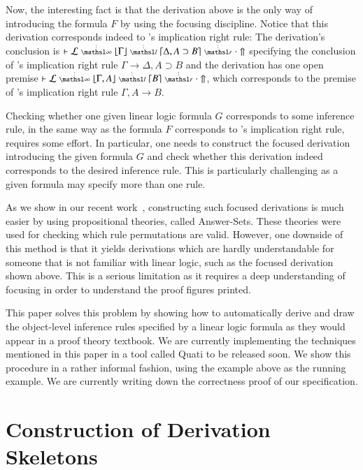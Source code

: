 \documentclass[a4paper,10pt]{article}
\newcommand\lra{\longrightarrow}
\begin{document}
Now, the interesting fact is that the derivation above is the only way of
introducing the formula $F$ by using the focusing discipline. Notice that this
derivation corresponds indeed to \mLJ's implication right rule: The derivation's
conclusion is $\llfDash \lEnc \ndots{\infty} \lft{\Gamma} \ndots{l}
{\rght{\Delta, A \supset B}} \ndots{r} \cdot \Uparrow$ specifying the conclusion
of \mLJ's implication right rule $\Gamma \lra \Delta, A \supset B$ and the
derivation has one open premise $\llfDash \lEnc \ndots{\infty} \lft{\Gamma, A}
\ndots{l} \rght{B} \ndots{r} \cdot \Uparrow$, which corresponds to the premise
of \mLJ's implication right rule $\Gamma, A \lra B$.

Checking whether one given linear logic formula $G$ corresponds to some
inference rule, in the same way as the formula $F$ corresponds to \mLJ's
implication right rule, requires some effort. In particular, one needs
to construct the focused derivation introducing the given formula $G$ and check whether this derivation indeed
corresponds to the desired inference rule. This is particularly challenging as a given formula may specify 
more than one rule. 

As we show in our recent work~\cite{nigam13iclp}, constructing such focused derivations is 
much easier by using propositional theories, called Answer-Sets. These theories were used for
checking which rule permutations are valid. However, one downside of this method is that it 
yields derivations which are hardly understandable for someone that is not familiar with linear logic, 
such as the focused derivation shown above. This is a serious limitation as it requires
a deep understanding of focusing in order to understand the proof figures printed.

This paper solves this problem by showing how to automatically derive and draw
the object-level inference rules
specified by a linear logic formula as they would appear in a proof theory textbook. We are currently
implementing the techniques mentioned in this paper in a tool called Quati to be released soon.
We show this procedure in a rather informal fashion, using the example above as
the running example. 
We are currently writing down the correctness proof of our specification.


\section{Construction of Derivation Skeletons}
\end{document}
